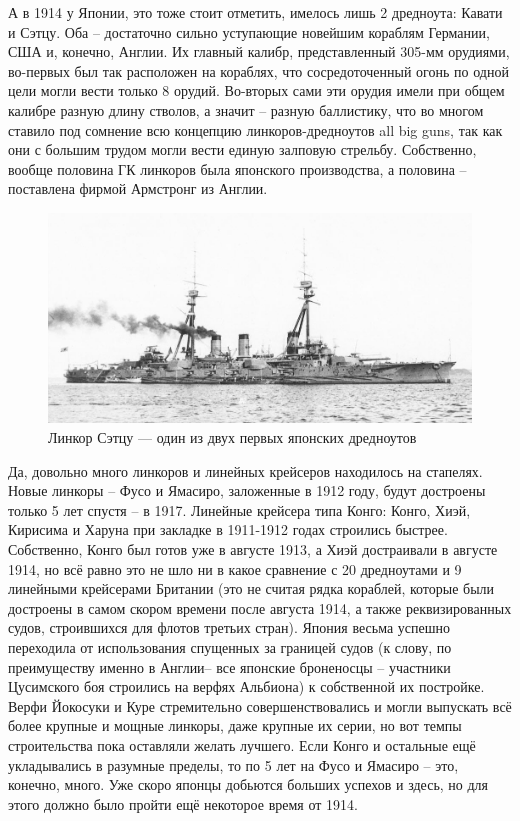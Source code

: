 А в 1914 у Японии, это тоже стоит отметить, имелось лишь 2 дредноута: Кавати и Сэтцу. Оба – достаточно сильно уступающие новейшим кораблям Германии, США и, конечно, Англии. Их главный калибр, представленный 305-мм орудиями, во-первых был так расположен на кораблях, что сосредоточенный огонь по одной цели могли вести только 8 орудий. Во-вторых сами эти орудия имели при общем калибре разную длину стволов, а значит – разную баллистику, что во многом ставило под сомнение всю концепцию линкоров-дредноутов all big guns, так как они с большим трудом могли вести единую залповую стрельбу. Собственно, вообще половина ГК линкоров была японского производства, а половина – поставлена фирмой Армстронг из Англии.

\begin{figure}[h!tb] 
	\centering\includegraphics[scale=0.4]{Glava3/sbSwXbGYo1g.jpg}
	\caption{Линкор Сэтцу — один из двух первых японских дредноутов}%
\end{figure}

Да, довольно много линкоров и линейных крейсеров находилось на стапелях. Новые линкоры – Фусо и Ямасиро, заложенные в 1912 году, будут достроены только 5 лет спустя – в 1917. Линейные крейсера типа Конго: Конго, Хиэй, Кирисима и Харуна при закладке в 1911-1912 годах строились быстрее. Собственно, Конго был готов уже в августе 1913, а Хиэй достраивали в августе 1914, но всё равно это не шло ни в какое сравнение с 20 дредноутами и 9 линейными крейсерами Британии (это не считая рядка кораблей, которые были достроены в самом скором времени после августа 1914, а также реквизированных судов, строившихся для флотов третьих стран). Япония весьма успешно переходила от использования спущенных за границей судов (к слову, по преимуществу именно в Англии– все японские броненосцы – участники Цусимского боя строились на верфях Альбиона) к собственной их постройке. Верфи Йокосуки и Куре стремительно совершенствовались и могли выпускать всё более крупные и мощные линкоры, даже крупные их серии, но вот темпы строительства пока оставляли желать лучшего. Если Конго и остальные ещё укладывались в разумные пределы, то по 5 лет на Фусо и Ямасиро – это, конечно, много. Уже скоро японцы добьются больших успехов и здесь, но для этого должно было пройти ещё некоторое время от 1914.

